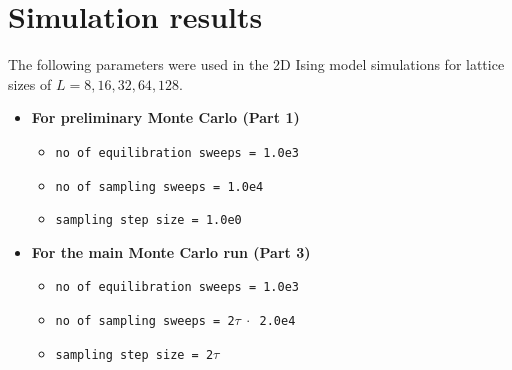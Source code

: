 \documentclass[../journal_main.tex]{subfiles}
\begin{document}
\section{Simulation results}
The following parameters were used in the 2D Ising model simulations for lattice sizes of $L = 8, 16, 32, 64, 128$.  
\begin{itemize}[label={}]    
    \setlength{\itemsep}{0.1em}
    \item \textbf{For preliminary Monte Carlo (Part 1)}
    \begin{itemize}[label={}] 
        \setlength{\itemsep}{0.1em}   
        \item \texttt{no of equilibration sweeps = 1.0e3}
        \item \texttt{no of sampling sweeps = 1.0e4}
        \item \texttt{sampling step size = 1.0e0}
    \end{itemize} 
    \item \textbf{For the main Monte Carlo run (Part 3)}
    \begin{itemize}[label={}]    
        \setlength{\itemsep}{0.1em}
        \item \texttt{no of equilibration sweeps = 1.0e3}
        \item \texttt{no of sampling sweeps = 2$\tau \: \cdot$ 2.0e4}
        \item \texttt{sampling step size = 2$\tau $ }
    \end{itemize} 
\end{itemize}
\end{document}
